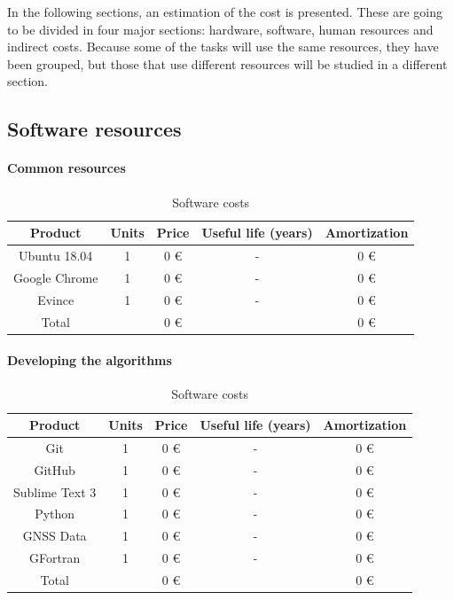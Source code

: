 In the following sections, an estimation of the cost is presented. These are going to be divided in four major sections: hardware, software, human resources and indirect costs. Because  some of the tasks will use the same resources, they have been grouped, but those that use different resources will be studied in a different section.

\subsection{Software resources}

\paragraph{Common resources}

\begin{table}[h!]
	\centering
	\def\arraystretch{1.2}
	\begin{tabular}{|c c c c c|} 
		\hline
		Product & Units & Price & Useful life (years) & Amortization \\ [0.5ex] 
		\hline\hline
		Ubuntu 18.04 & 1 & 0 \euro & - & 0 \euro \\ 
		\hline
		Google Chrome & 1 & 0 \euro & - & 0 \euro \\
		\hline
		Evince & 1 & 0 \euro & - & 0 \euro \\
		\hline\hline
		Total &  & 0 \euro &  & 0 \euro \\
		\hline
	\end{tabular}
	\caption{Software costs}
\end{table}

\paragraph{Developing the algorithms}

\begin{table}[h!]
	\centering
	\def\arraystretch{1.2}
	\begin{tabular}{|c c c c c|} 
		\hline
		Product & Units & Price & Useful life (years) & Amortization \\
		\hline\hline
		Git & 1 & 0 \euro & - & 0 \euro \\ 
		\hline
		GitHub & 1 & 0 \euro & - & 0 \euro \\
		\hline
		Sublime Text 3 & 1 & 0 \euro & - & 0 \euro \\
		\hline
		Python & 1 & 0 \euro & - & 0 \euro \\
		\hline
		GNSS Data & 1 & 0 \euro & - & 0 \euro \\
		\hline
		GFortran & 1 & 0 \euro & - & 0 \euro \\
		\hline\hline
		Total &   & 0 \euro &  & 0 \euro \\
		\hline
	\end{tabular}
	\caption{Software costs}
\end{table}

